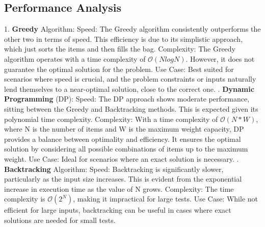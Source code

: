 \documentclass{llncs}
\begin{document}
\subsection{Performance Analysis}
1. \textbf{Greedy} Algorithm:
Speed: The Greedy algorithm consistently outperforms the other two in terms of speed. This
efficiency is due to its simplistic approach, which just sorts the items and then fills the bag.
Complexity: The Greedy algorithm operates with a time complexity of $\mathcal{O}(NlogN)$. However, it does not guarantee the optimal solution for the problem.
Use Case: Best suited for scenarios where speed is crucial, and the problem constraints or inputs 
naturally lend themselves to a near-optimal solution, close to the correct one.
. \textbf{Dynamic Programming} (DP):
Speed: The DP approach shows moderate performance, sitting between the Greedy and Backtracking 
methods. This is expected given its polynomial time complexity.
Complexity: With a time complexity of $\mathcal{O}(N*W)$,  where N is the number of items and 
W is the maximum weight capacity, DP provides a balance between optimality and efficiency. It 
ensures the optimal solution by considering all possible combinations of items up to the maximum
weight.
Use Case: Ideal for scenarios where an exact solution is necessary.
. \textbf{Backtracking} Algorithm:
Speed: Backtracking is significantly slower, particularly as the input size increases. This is
evident from the exponential increase in execution time as the value of N grows.
Complexity: The time complexity is $\mathcal{O}(2^N)$, making it impractical for large tests.
Use Case: While not efficient for large inputs, backtracking can be useful in cases where exact 
solutions are needed for small tests.
\clearpage
\end{document}
